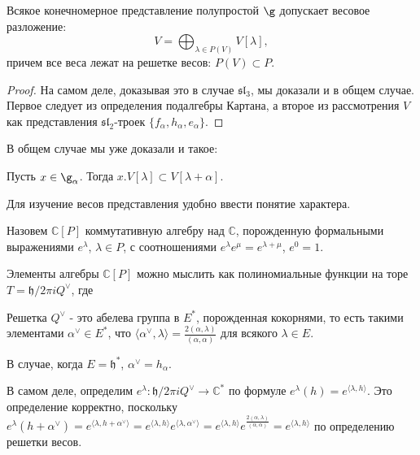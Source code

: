 \documentclass[a4article]{article}
\begin{document}
\begin{theorem}
    Всякое конечномерное представление полупростой $\g$ допускает весовое разложение:
    \begin{equation}
        V=\bigoplus_{\lambda \in P(V)} V[\lambda],
    \end{equation}
    причем все веса лежат на решетке весов: $P(V) \subset P$.
\end{theorem}
\begin{proof}
    На самом деле, доказывая это в случае $\mathfrak{sl}_3$, мы доказали и в общем случае. Первое следует из определения подалгебры Картана, а второе из рассмотрения $V$ как представления $\mathfrak{sl}_2$-троек $\{f_\alpha, h_\alpha, e_\alpha\}$.
\end{proof}
В общем случае мы уже доказали и такое:
\begin{lemma}
    Пусть $x \in \g_{\alpha}$. Тогда $x.V[\lambda] \subset V[\lambda + \alpha]$.
\end{lemma}

Для изучение весов представления удобно ввести понятие характера.
\begin{definition}
    Назовем $\mathbb{C}[P]$ коммутативную алгебру над $\mathbb{C}$, порожденную формальными выражениями $e^{\lambda}$, $\lambda \in P$, с соотношениями $e^{\lambda}e^{\mu}=e^{\lambda+\mu}$, $e^0=1$.
\end{definition}
Элементы алгебры $\mathbb{C}[P]$ можно мыслить как полиномиальные функции на торе $T=\mathfrak{h}/2\pi iQ^{\vee}$, где 
\begin{definition}
    Решетка $Q^{\vee}$ - это абелева группа в $E^*$, порожденная кокорнями, то есть такими элементами $\alpha^{\vee} \in E^*$, что $\langle \alpha^{\vee}, \lambda \rangle = \frac{2(\alpha, \lambda)}{(\alpha, \alpha)}$ для всякого $\lambda \in E$.
\end{definition}
\begin{remark}
    В случае, когда $E=\mathfrak{h}^*$, $\alpha^{\vee}=h_{\alpha}$.
\end{remark}
В самом деле, определим $e^{\lambda}: \mathfrak{h}/2\pi iQ^{\vee} \rightarrow \mathbb{C}^*$ по формуле $e^{\lambda}(h)=e^{\langle\lambda, h \rangle}$. Это определение корректно, поскольку $e^{\lambda}(h+\alpha^{\vee})=e^{\langle \lambda, h+\alpha^{\vee}\rangle}=e^{\langle\lambda, h \rangle}e^{\langle \lambda, \alpha^{\vee}\rangle}=e^{\langle\lambda, h \rangle}e^{\frac{2(\alpha, \lambda)}{(\alpha, \alpha)}}=e^{\langle\lambda, h \rangle}$ по определению решетки весов.
\end{document}
